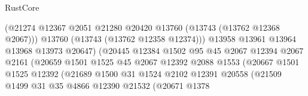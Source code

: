 \begin{lexlean}{RustCore}
\begin{coremodule}
                                          (@21274
                                            @12367
                                            @2051
                                            @21280
                                            @20420
                                            @13760
                                            (@13743 (@13762 @12368 @2067)))
                                          @13760
                                          (@13743 (@13762 @12358 @12374)))
                                        @13958
                                        @13961
                                        @13964
                                        @13968
                                        @13973
                                        @20647)
                                      (@20445
                                        @12384
                                        @1502
                                        @95
                                        @45
                                        @2067
                                        @12394
                                        @2067
                                        @2161
                                        (@20659
                                          @1501
                                          @1525
                                          @45
                                          @2067
                                          @12392
                                          @2088
                                          @1553
                                          (@20667
                                            @1501
                                            @1525
                                            @12392
                                            (@21689
                                              @1500
                                              @31
                                              @1524
                                              @2102
                                              @12391
                                              @20558
                                              (@21509
                                                @1499
                                                @31
                                                @35
                                                @4866
                                                @12390
                                                @21532
                                                (@20671
                                                  @1378

\end{coremodule}
\end{lexlean}
